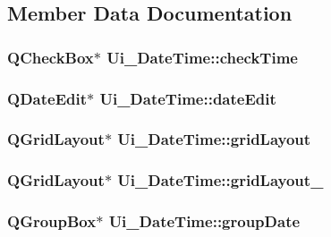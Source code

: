 \subsection{Member Data Documentation}
\hypertarget{class_ui___date_time_acd3af509eccfb3a359c9a76ea8dfa2d4}{
\subsubsection[{checkTime}]{\setlength{\rightskip}{0pt plus 5cm}QCheckBox$\ast$ {\bf Ui\_\-DateTime::checkTime}}}
\label{class_ui___date_time_acd3af509eccfb3a359c9a76ea8dfa2d4}
\hypertarget{class_ui___date_time_ac05a6b58da81b4d73730ab4deffc37d7}{
\subsubsection[{dateEdit}]{\setlength{\rightskip}{0pt plus 5cm}QDateEdit$\ast$ {\bf Ui\_\-DateTime::dateEdit}}}
\label{class_ui___date_time_ac05a6b58da81b4d73730ab4deffc37d7}
\hypertarget{class_ui___date_time_afd7d89b895d622f67653fc453dc781a7}{
\subsubsection[{gridLayout}]{\setlength{\rightskip}{0pt plus 5cm}QGridLayout$\ast$ {\bf Ui\_\-DateTime::gridLayout}}}
\label{class_ui___date_time_afd7d89b895d622f67653fc453dc781a7}
\hypertarget{class_ui___date_time_a5e283d401d2a14332b5c057dca4b5191}{
\subsubsection[{gridLayout\_\-2}]{\setlength{\rightskip}{0pt plus 5cm}QGridLayout$\ast$ {\bf Ui\_\-DateTime::gridLayout\_}}}
\label{class_ui___date_time_a5e283d401d2a14332b5c057dca4b5191}
\hypertarget{class_ui___date_time_aa589c9b11f049e55441921472edf5edb}{
\subsubsection[{groupDate}]{\setlength{\rightskip}{0pt plus 5cm}QGroupBox$\ast$ {\bf Ui\_\-DateTime::groupDate}}}
